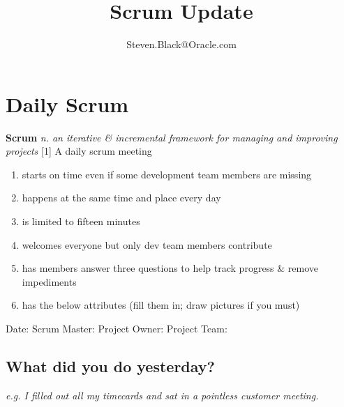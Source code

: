\documentclass[12pt]{article}%
\begin{document}
\title{Scrum Update}
\author{Steven.Black@Oracle.com}
\maketitle

\section{Daily Scrum}
\textbf{Scrum} 
\textit{n. an iterative \& incremental framework for managing and improving projects} 
[1]
\newline 
\newline 
A daily scrum meeting
\begin{enumerate}[nosep, label=\textendash]
	\item starts on time even if some development team members are missing
    \item happens at the same time and place every day
    \item is limited to fifteen minutes 
    \item welcomes everyone but only dev team members contribute
    \item has members answer three questions to help track progress \& remove impediments
    \item has the below attributes (fill them in; draw pictures if you must)
\end{enumerate}
\hfill

\noindent
Date: \hspace{18mm} \underline{\hspace{3cm}}
\newline
Scrum Master: \hspace{3mm} \underline{\hspace{3cm}}
\newline
Project Owner: \hspace{2mm} \underline{\hspace{3cm}}
\newline
Project Team: \hspace{4mm} \underline{\hspace{3cm}}
\newline


\subsection{What did you do yesterday?}
\textit{e.g. I filled out all my timecards and sat in a pointless customer meeting.}
\newline 
\end{document}
